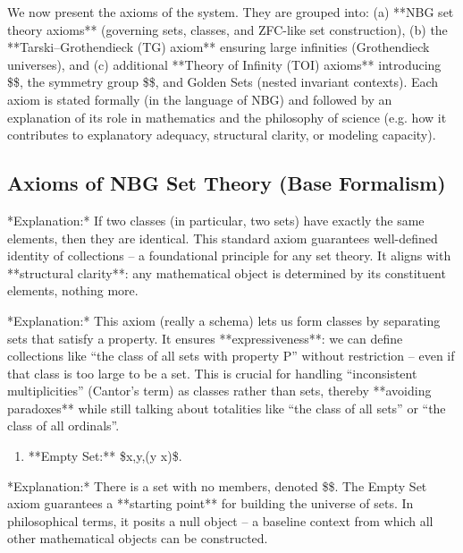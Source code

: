 \documentclass[11pt]{article}
\begin{document}
We now present the axioms of the system. They are grouped into: (a) **NBG set theory axioms** (governing sets, classes, and ZFC-like set construction), (b) the **Tarski–Grothendieck (TG) axiom** ensuring large infinities (Grothendieck universes), and (c) additional **Theory of Infinity (TOI) axioms** introducing \$\infty\$, the symmetry group \$\Sym\$, and Golden Sets (nested invariant contexts). Each axiom is stated formally (in the language of NBG) and followed by an explanation of its role in mathematics and the philosophy of science (e.g. how it contributes to explanatory adequacy, structural clarity, or modeling capacity).

\subsection*{Axioms of NBG Set Theory (Base Formalism)}

\begin{enumerate}
  \item **Extensionality:** \$\forall x,\forall y,\big\[,\forall z,(z \in x \Leftrightarrow z \in y)\ \rightarrow\ x = y,\big]\$.
\end{enumerate}
   *Explanation:* If two classes (in particular, two sets) have exactly the same elements, then they are identical. This standard axiom guarantees well-defined identity of collections – a foundational principle for any set theory. It aligns with **structural clarity**: any mathematical object is determined by its constituent elements, nothing more.

\begin{enumerate}
  \item **Class Comprehension (Schema):** For any formula \$\phi(x)\$ *that quantifies only over sets*, there exists a class \$C = {,x : \phi(x),}\$ such that \$\forall x,\[x \in C \Leftrightarrow \phi(x)]\$.
\end{enumerate}
   *Explanation:* This axiom (really a schema) lets us form classes by separating sets that satisfy a property. It ensures **expressiveness**: we can define collections like “the class of all sets with property P” without restriction – even if that class is too large to be a set. This is crucial for handling “inconsistent multiplicities” (Cantor’s term) as classes rather than sets, thereby **avoiding paradoxes** while still talking about totalities like “the class of all sets” or “the class of all ordinals”.

\begin{enumerate}
  \item **Empty Set:** \$\exists x,\forall y,(y \notin x)\$.
\end{enumerate}
   *Explanation:* There is a set with no members, denoted \$\varnothing\$. The Empty Set axiom guarantees a **starting point** for building the universe of sets. In philosophical terms, it posits a null object – a baseline context from which all other mathematical objects can be constructed.
\end{document}
